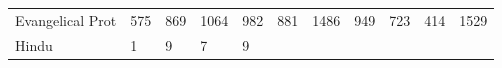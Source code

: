 \documentclass[]{article}
\begin{document}
\begin{longtable}[]{@{}lllllllllll@{}}
\begin{minipage}[t]{0.14\columnwidth}\raggedright
Evangelical Prot\strut
\end{minipage} & \begin{minipage}[t]{0.04\columnwidth}\raggedright
575\strut
\end{minipage} & \begin{minipage}[t]{0.05\columnwidth}\raggedright
869\strut
\end{minipage} & \begin{minipage}[t]{0.05\columnwidth}\raggedright
1064\strut
\end{minipage} & \begin{minipage}[t]{0.05\columnwidth}\raggedright
982\strut
\end{minipage} & \begin{minipage}[t]{0.05\columnwidth}\raggedright
881\strut
\end{minipage} & \begin{minipage}[t]{0.05\columnwidth}\raggedright
1486\strut
\end{minipage} & \begin{minipage}[t]{0.06\columnwidth}\raggedright
949\strut
\end{minipage} & \begin{minipage}[t]{0.06\columnwidth}\raggedright
723\strut
\end{minipage} & \begin{minipage}[t]{0.04\columnwidth}\raggedright
414\strut
\end{minipage} & \begin{minipage}[t]{0.11\columnwidth}\raggedright
1529\strut
\end{minipage}\tabularnewline
\begin{minipage}[t]{0.14\columnwidth}\raggedright
Hindu\strut
\end{minipage} & \begin{minipage}[t]{0.04\columnwidth}\raggedright
1\strut
\end{minipage} & \begin{minipage}[t]{0.05\columnwidth}\raggedright
9\strut
\end{minipage} & \begin{minipage}[t]{0.05\columnwidth}\raggedright
7\strut
\end{minipage} & \begin{minipage}[t]{0.05\columnwidth}\raggedright
9\strut
\end{minipage} & \begin{minipage}[t]{0.05\columnwidth}\raggedright

\end{minipage}
\end{longtable}
\end{document}
